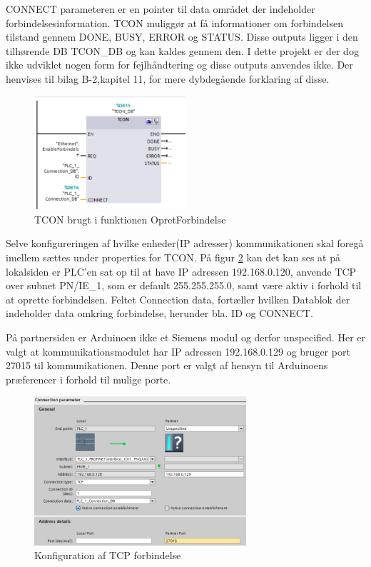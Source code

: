CONNECT parameteren er en pointer til data området der indeholder forbindelsesinformation. TCON muliggør at få informationer om forbindelsen tilstand gennem DONE, BUSY, ERROR og STATUS. Disse outputs ligger i den tilhørende DB TCON\_DB og kan kaldes gennem den. I dette projekt er der dog ikke udviklet nogen form for fejlhåndtering og disse outputs anvendes ikke. Der henvises til bilag B-2,kapitel 11, for mere dybdegående forklaring af disse.

\begin{figure}[H] %
	\centering
	\includegraphics[width=0.5\textwidth]{Figure/TCON}
	\caption{TCON brugt i funktionen OpretForbindelse}
	\label{fig:TCON}
\end{figure}

Selve konfigureringen af hvilke enheder(IP adresser) kommunikationen skal foregå imellem sættes under properties for TCON. På figur \ref{fig:Konfiguration} kan det kan ses at på lokalsiden er PLC'en sat op til at have IP adressen 192.168.0.120, anvende TCP over subnet PN/IE\_1, som er default 255.255.255.0, samt være aktiv i forhold til at oprette forbindelsen. Feltet Connection data, fortæller hvilken Datablok der indeholder data omkring forbindelse, herunder bla. ID og CONNECT.

På partnersiden er Arduinoen ikke et Siemens modul og derfor unspecified. Her er valgt at kommunikationsmodulet har IP adressen 192.168.0.129 og bruger port 27015 til kommunikationen. Denne port er valgt af hensyn til Arduinoens præferencer i forhold til mulige porte.

\begin{figure}[H] %
	\centering
	\includegraphics[width=0.7\textwidth]{Figure/KonfigurationAfTCPforbindelse}
	\caption{Konfiguration af TCP forbindelse}
	\label{fig:Konfiguration}
\end{figure}


